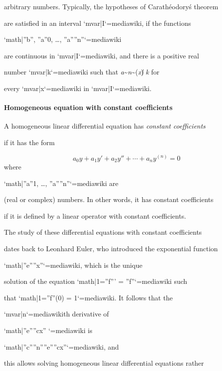 arbitrary numbers. Typically, the hypotheses of Carathéodory\'s theorem

are satisfied in an interval `{{mvar|I}}`{=mediawiki}, if the functions

`{{math|''b'', ''a''0, …, ''a''''n''}}`{=mediawiki}

are continuous in `{{mvar|I}}`{=mediawiki}, and there is a positive real

number `{{mvar|k}}`{=mediawiki} such that \|\textit{a}\textasciitilde{}\textit{n}\textasciitilde{}(\textit{x})\| \> \textit{k} for

every `{{mvar|x}}`{=mediawiki} in `{{mvar|I}}`{=mediawiki}.



\paragraph{Homogeneous equation with constant coefficients}



A homogeneous linear differential equation has \textit{constant coefficients}

if it has the form



$$a_0y + a_1y' + a_2y'' + \cdots + a_n y^{(n)} = 0$$ where

`{{math|''a''1, …, ''a''''n''}}`{=mediawiki} are

(real or complex) numbers. In other words, it has constant coefficients

if it is defined by a linear operator with constant coefficients.



The study of these differential equations with constant coefficients

dates back to Leonhard Euler, who introduced the exponential function

`{{math|''e''''x''}}`{=mediawiki}, which is the unique

solution of the equation `{{math|1=''f''' = ''f''}}`{=mediawiki} such

that `{{math|1=''f''(0) = 1}}`{=mediawiki}. It follows that the

`{{mvar|n}}`{=mediawiki}th derivative of

`{{math|''e''''cx'' }}`{=mediawiki} is

`{{math|''c''''n''''e''''cx''}}`{=mediawiki}, and

this allows solving homogeneous linear differential equations rather

